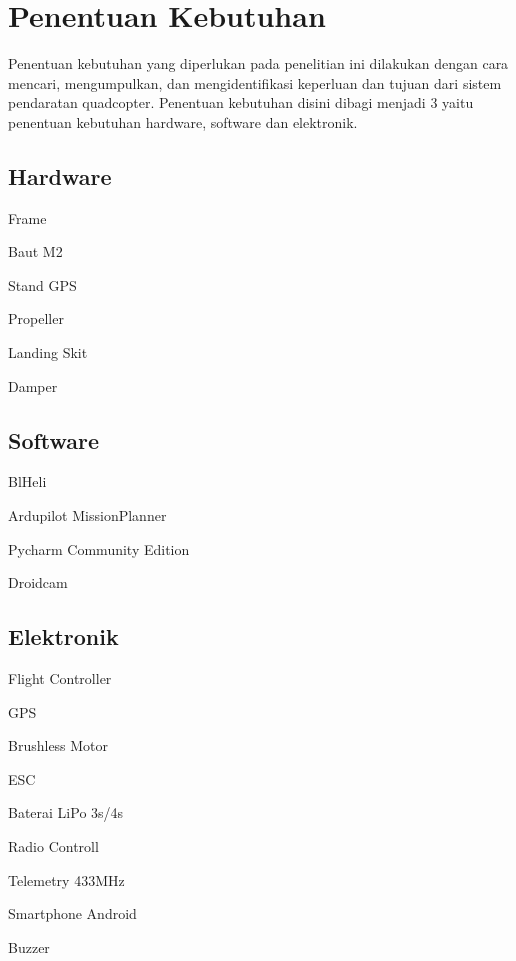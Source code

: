 \section{Penentuan Kebutuhan}
Penentuan kebutuhan yang diperlukan pada penelitian ini dilakukan dengan cara mencari, mengumpulkan, dan mengidentifikasi keperluan dan tujuan dari sistem pendaratan quadcopter. Penentuan kebutuhan disini dibagi menjadi 3 yaitu penentuan kebutuhan hardware, software dan elektronik.

\subsection{Hardware}

\begin{packed_enum}
	\item Frame
	\item Baut M2
	\item Stand GPS
	\item Propeller
	\item Landing Skit
	\item Damper
\end{packed_enum}

\subsection{Software}

\begin{packed_enum}
	\item BlHeli
	\item Ardupilot MissionPlanner
	\item Pycharm Community Edition
	\item Droidcam
\end{packed_enum}

\subsection{Elektronik}
\begin{packed_enum}
	\item Flight Controller
	\item GPS
	\item Brushless Motor
	\item ESC
	\item Baterai LiPo 3s/4s
	\item Radio Controll
	\item Telemetry 433MHz
	\item Smartphone Android
	\item Buzzer
\end{packed_enum}

